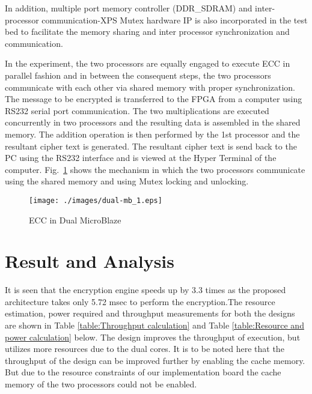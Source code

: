 \documentclass[preprint,12pt]{elsarticle}
\begin{document}
In addition, multiple port memory controller (DDR\_SDRAM) and inter-processor communication-XPS Mutex hardware IP
\cite{dual} is also incorporated in the test bed to facilitate the memory sharing and inter processor synchronization and communication.
\par In the experiment, the two processors are equally engaged to execute ECC in parallel fashion and in between the consequent steps, the two processors communicate with each other via shared memory with proper synchronization. The message to be encrypted is transferred to the FPGA from a computer using RS232 serial port communication. The two multiplications are executed concurrently in two processors and the resulting data is assembled in the shared memory. The addition operation is then performed by the 1st processor and the resultant cipher text is generated. The resultant cipher text is send back to the PC using the RS232 interface and is viewed at the Hyper Terminal of the computer. Fig.~\ref{dual-mb} shows the mechanism in which the two processors communicate using the shared memory and using Mutex locking and unlocking.\begin{figure}[htbp]
\vspace{-10pt}
\centering
\texttt{[image: ./images/dual-mb\_1.eps]}
\caption{ECC in Dual MicroBlaze}
\label{dual-mb}
\vspace{-20pt}
\end{figure}

\section{Result and Analysis}
It is seen that the encryption engine speeds up by 3.3 times as the proposed architecture takes only 5.72 msec to perform the encryption.The resource estimation, power required and throughput measurements for both the designs are shown in Table \ref{table:Throughput calculation} and Table \ref{table:Resource and power calculation} below. The design improves the throughput of execution, but utilizes more resources due to the dual cores. It is to be noted here that the throughput of the design can be improved further by enabling the cache memory. But due to the resource constraints of our implementation board the cache memory of the two processors could not be enabled.
\end{document}
